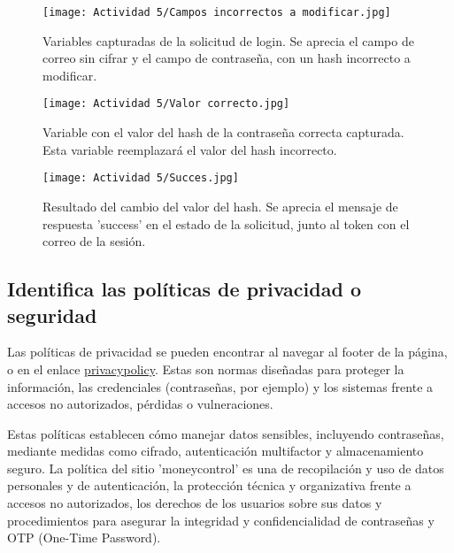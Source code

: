 \documentclass[letter,12pt]{article}
\begin{document}
\begin{figure}[H]
    \centering
    \texttt{[image: Actividad 5/Campos incorrectos a modificar.jpg]}
    \caption{Variables capturadas de la solicitud de login. Se aprecia el campo de correo sin cifrar y el campo de contraseña, con un hash incorrecto a modificar.}
    \label{fig:campos incorrectos}
\end{figure}

\begin{figure}[H]
    \centering
    \texttt{[image: Actividad 5/Valor correcto.jpg]}
    \caption{Variable con el valor del hash de la contraseña correcta capturada. Esta variable reemplazará el valor del hash incorrecto.}
    \label{fig:valor correcto}
\end{figure}

\begin{figure}[H]
    \centering
    \texttt{[image: Actividad 5/Succes.jpg]}
    \caption{Resultado del cambio del valor del hash. Se aprecia el mensaje de respuesta 'success' en el estado de la solicitud, junto al token con el correo de la sesión.}
    \label{fig:Acces Denied}
\end{figure}

\subsection{Identifica las políticas de privacidad o seguridad}
Las políticas de privacidad se pueden encontrar al navegar al footer de la página, o en el enlace \href{https://www.moneycontrol.com/cdata/privacypolicy.php}{privacypolicy}. Estas son normas diseñadas para proteger la información, las credenciales (contraseñas, por ejemplo) y los sistemas frente a accesos no autorizados, pérdidas o vulneraciones. 

Estas políticas establecen cómo manejar datos sensibles, incluyendo contraseñas, mediante medidas como cifrado, autenticación multifactor y almacenamiento seguro. La política del sitio 'moneycontrol' es una de recopilación y uso de datos personales y de autenticación, la protección técnica y organizativa frente a accesos no autorizados, los derechos de los usuarios sobre sus datos y procedimientos para asegurar la integridad y confidencialidad de contraseñas y OTP (One-Time Password).
\end{document}
